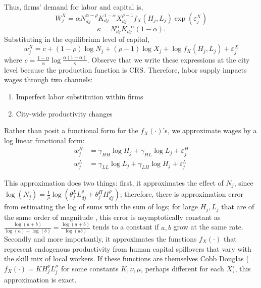 \documentclass{article}
\begin{document}
Thus, firms' demand for labor and capital is,
$$W_{j}^X = \alpha N_{dj}^{\alpha-\rho} K_{dj}^{1-\alpha} X_{dj}^{\rho-1}f_X(H_{j},L_{j})\exp(\varepsilon_{j}^X)$$
$$\kappa = N_{dj}^\alpha K_{dj}^{-\alpha}(1-\alpha).$$
Substituting in the equilibrium level of capital,
\begin{equation*}\label{eq_wage_eq}
    w_{j}^X = c + (1-\rho)\log N_{j} + (\rho-1)\log X_{j} + \log f_X(H_{j},L_{j}) + \varepsilon_{j}^X
\end{equation*}
where $c = \frac{1-\alpha}{\alpha} \log \frac{\alpha(1-\alpha)}{\kappa}$. Observe that we write these expressions at the city level because the production function is CRS. 
Therefore, labor supply impacts wages through two channels:
\begin{enumerate}
    \item Imperfect labor substitution within firms
    \item City-wide productivity changes
\end{enumerate}
Rather than posit a functional form for the $f_{X}(\cdot)$'s, we approximate wages by a log linear functional form:
\begin{align}
    w_{j}^H &= \gamma_{HH}\log H_{j} + \gamma_{HL} \log L_{j} + \varepsilon_{j}^H \label{eq_wage_h_aprx} 
    \\ 
    w_{j}^L &= \gamma_{LL}\log L_{j} + \gamma_{LH} \log H_{j} + \varepsilon_{j}^L \label{eq_wage_l_aprx} 
\end{align}

This approximation does two things: first, it approximates the effect of $N_{j}$, since $\log(N_{j}) = \frac{1}{\rho}\log(\theta^L_{j} L^\rho_{dj} + \theta^H_{j} H^\rho_{dj})$; therefore, there is approximation error from estimating the log of sums with the sum of logs; for large $H_{j}, L_{j}$ that are of the same order of magnitude , this error is asymptotically constant as $\frac{\log(a+b)}{\log(a) + \log(b)} = \frac{\log(a + b)}{\log(ab )}$ tends to a constant if $a,b$ grow at the same rate. Secondly and more importantly, it approximates the functions $f_X(\cdot)$ that represent endogenous productivity from human capital spillovers that vary with the skill mix of local workers. If these functions are themselves Cobb Douglas ($f_X(\cdot) = K H_{j}^\nu L_{j}^\mu$ for some constants $K,\nu,\mu$, perhaps different for each $X$), this approximation is exact. 
\end{document}
